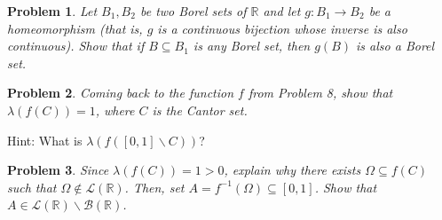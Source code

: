 \documentclass[reqno]{amsart}
\theoremstyle{plain}
\newtheorem{problem}{Problem}
\theoremstyle{definition}
\begin{document}
\begin{problem}
Let $B_{1}, B_{2}$ be two Borel sets of $\mathbb{R}$ and let $g:B_{1} \rightarrow B_{2}$ be a homeomorphism (that is, $g$ is a continuous bijection whose inverse is also continuous).  Show that if $B \subseteq B_{1}$ is any Borel set, then $g(B)$ is also a Borel set.
\end{problem}

\begin{problem}
Coming back to the function $f$ from Problem 8, show that $\lambda(f(C)) = 1$, where $C$ is the Cantor set.
\end{problem}
Hint:  What is $\lambda(f([0,1]\smallsetminus C))$?

\begin{problem}
Since $\lambda(f(C)) = 1 > 0$, explain why there exists $\Omega \subseteq f(C)$ such that $\Omega \notin \mathcal{L}(\mathbb{R})$.  Then, set $A = f^{-1}(\Omega) \subseteq [0,1]$.  Show that $A \in \mathcal{L}(\mathbb{R}) \smallsetminus \mathcal{B}(\mathbb{R})$.
\end{problem}
\end{document}
